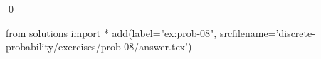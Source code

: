 
\begin{ex} 
  \label{ex:prob-08}
  
  \qed
\end{ex} 
\begin{python0}
from solutions import *
add(label="ex:prob-08",
    srcfilename='discrete-probability/exercises/prob-08/answer.tex') 
\end{python0}
